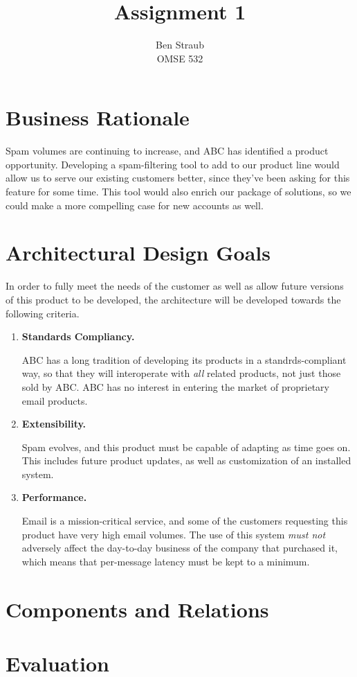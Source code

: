 \documentclass[11pt,letterpaper]{article}
\begin{document}
\author{Ben Straub\\OMSE 532}
\title{Assignment 1}
\maketitle


\section{Business Rationale}

Spam volumes are continuing to increase, and ABC has identified a product
opportunity.  Developing a spam-filtering tool to add to our product line
would allow us to serve our existing customers better, since they've been
asking for this feature for some time.  This tool would also enrich our
package of solutions, so we could make a more compelling case for new accounts
as well.



\section{Architectural Design Goals}

In order to fully meet the needs of the customer as well as allow future
versions of this product to be developed, the architecture will be developed
towards the following criteria.

\begin{enumerate}
\item \textbf{Standards Compliancy.}

  ABC has a long tradition of developing its products in a standrds-compliant
  way, so that they will interoperate with \textit{all} related products, not
  just those sold by ABC.  ABC has no interest in entering the market of
  proprietary email products.

\item \textbf{Extensibility.}

  Spam evolves, and this product must be capable of adapting as time goes on.
  This includes future product updates, as well as customization of an
  installed system.

\item \textbf{Performance.}

  Email is a mission-critical service, and some of the customers requesting
  this product have very high email volumes.  The use of this system
  \textit{must not} adversely affect the day-to-day business of the company
  that purchased it, which means that per-message latency must be kept to a
  minimum.  

\end{enumerate}

\section{Components and Relations}

\section{Evaluation}
\end{document}
